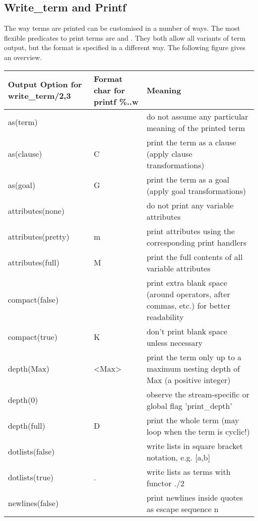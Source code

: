\subsection{Write_term and Printf}

The way {\eclipse} terms are printed can be customised in a number of ways.
The most flexible predicates to print terms are
and
.
They both allow all variants of term output, but the format is
specified in a different way.
The following figure gives an overview.
\begin{center}
\begin{tabular}{|p{3.5cm}|p{1.5cm}|p{10cm}|}
\hline
Output Option for write_term/2,3 & Format char for printf \%..w & Meaning \\
\hline
\hline
as(term)		&   & do not assume any particular meaning of the printed term \\
\hline
as(clause)		& C & print the term as a clause (apply clause transformations) \\
\hline
as(goal)		& G & print the term as a goal (apply goal transformations) \\
\hline
attributes(none)	&   & do not print any variable attributes \\
\hline
attributes(pretty)	& m & print attributes using the corresponding print handlers \\
\hline
attributes(full)	& M & print the full contents of all variable attributes \\
\hline
compact(false)		&   & print extra blank space (around operators, after commas, etc.) for better readability \\
\hline
compact(true)		& K & don't print blank space unless necessary \\
\hline
depth(Max)		& <Max>  & print the term only up to a maximum nesting depth of Max (a positive integer) \\
\hline
depth(0)		&   & observe the stream-specific or global flag 'print_depth' \\
\hline
depth(full)		& D & print the whole term (may loop when the term is cyclic!) \\
\hline
dotlists(false)		&   & write lists in square bracket notation, e.g. [a,b] \\
\hline
dotlists(true)		& . & write lists as terms with functor ./2 \\
\hline
newlines(false)		&   & print newlines inside quotes as escape sequence {\bsl}n \\

\end{tabular}
\end{center}
